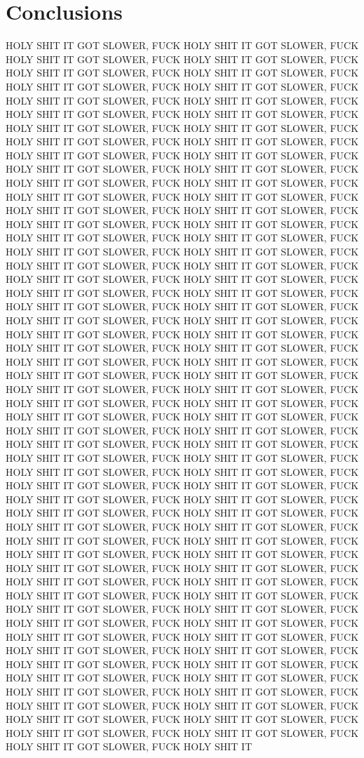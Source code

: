 \documentclass{acm_proc_article-sp}
\begin{document}
\section{Conclusions}
HOLY SHIT IT GOT SLOWER, FUCK HOLY SHIT IT GOT SLOWER, FUCK HOLY SHIT IT GOT SLOWER, FUCK HOLY SHIT IT GOT SLOWER, FUCK HOLY SHIT IT GOT SLOWER, FUCK HOLY SHIT IT GOT SLOWER, FUCK HOLY SHIT IT GOT SLOWER, FUCK HOLY SHIT IT GOT SLOWER, FUCK HOLY SHIT IT GOT SLOWER, FUCK HOLY SHIT IT GOT SLOWER, FUCK HOLY SHIT IT GOT SLOWER, FUCK HOLY SHIT IT GOT SLOWER, FUCK HOLY SHIT IT GOT SLOWER, FUCK HOLY SHIT IT GOT SLOWER, FUCK HOLY SHIT IT GOT SLOWER, FUCK HOLY SHIT IT GOT SLOWER, FUCK HOLY SHIT IT GOT SLOWER, FUCK HOLY SHIT IT GOT SLOWER, FUCK HOLY SHIT IT GOT SLOWER, FUCK HOLY SHIT IT GOT SLOWER, FUCK HOLY SHIT IT GOT SLOWER, FUCK HOLY SHIT IT GOT SLOWER, FUCK HOLY SHIT IT GOT SLOWER, FUCK HOLY SHIT IT GOT SLOWER, FUCK HOLY SHIT IT GOT SLOWER, FUCK HOLY SHIT IT GOT SLOWER, FUCK HOLY SHIT IT GOT SLOWER, FUCK HOLY SHIT IT GOT SLOWER, FUCK HOLY SHIT IT GOT SLOWER, FUCK HOLY SHIT IT GOT SLOWER, FUCK HOLY SHIT IT GOT SLOWER, FUCK HOLY SHIT IT GOT SLOWER, FUCK HOLY SHIT IT GOT SLOWER, FUCK HOLY SHIT IT GOT SLOWER, FUCK HOLY SHIT IT GOT SLOWER, FUCK HOLY SHIT IT GOT SLOWER, FUCK HOLY SHIT IT GOT SLOWER, FUCK HOLY SHIT IT GOT SLOWER, FUCK HOLY SHIT IT GOT SLOWER, FUCK HOLY SHIT IT GOT SLOWER, FUCK HOLY SHIT IT GOT SLOWER, FUCK HOLY SHIT IT GOT SLOWER, FUCK HOLY SHIT IT GOT SLOWER, FUCK HOLY SHIT IT GOT SLOWER, FUCK HOLY SHIT IT GOT SLOWER, FUCK HOLY SHIT IT GOT SLOWER, FUCK HOLY SHIT IT GOT SLOWER, FUCK HOLY SHIT IT GOT SLOWER, FUCK HOLY SHIT IT GOT SLOWER, FUCK HOLY SHIT IT GOT SLOWER, FUCK HOLY SHIT IT GOT SLOWER, FUCK HOLY SHIT IT GOT SLOWER, FUCK HOLY SHIT IT GOT SLOWER, FUCK HOLY SHIT IT GOT SLOWER, FUCK HOLY SHIT IT GOT SLOWER, FUCK HOLY SHIT IT GOT SLOWER, FUCK HOLY SHIT IT GOT SLOWER, FUCK HOLY SHIT IT GOT SLOWER, FUCK HOLY SHIT IT GOT SLOWER, FUCK HOLY SHIT IT GOT SLOWER, FUCK HOLY SHIT IT GOT SLOWER, FUCK HOLY SHIT IT GOT SLOWER, FUCK HOLY SHIT IT GOT SLOWER, FUCK HOLY SHIT IT GOT SLOWER, FUCK HOLY SHIT IT GOT SLOWER, FUCK HOLY SHIT IT GOT SLOWER, FUCK HOLY SHIT IT GOT SLOWER, FUCK HOLY SHIT IT GOT SLOWER, FUCK HOLY SHIT IT GOT SLOWER, FUCK HOLY SHIT IT GOT SLOWER, FUCK HOLY SHIT IT GOT SLOWER, FUCK HOLY SHIT IT GOT SLOWER, FUCK HOLY SHIT IT GOT SLOWER, FUCK HOLY SHIT IT GOT SLOWER, FUCK HOLY SHIT IT GOT SLOWER, FUCK HOLY SHIT IT GOT SLOWER, FUCK HOLY SHIT IT GOT SLOWER, FUCK HOLY SHIT IT GOT SLOWER, FUCK HOLY SHIT IT GOT SLOWER, FUCK HOLY SHIT IT GOT SLOWER, FUCK HOLY SHIT IT GOT SLOWER, FUCK HOLY SHIT IT GOT SLOWER, FUCK HOLY SHIT IT GOT SLOWER, FUCK HOLY SHIT IT GOT SLOWER, FUCK HOLY SHIT IT GOT SLOWER, FUCK HOLY SHIT IT GOT SLOWER, FUCK HOLY SHIT IT GOT SLOWER, FUCK HOLY SHIT IT GOT SLOWER, FUCK HOLY SHIT IT GOT SLOWER, FUCK HOLY SHIT IT GOT SLOWER, FUCK HOLY SHIT IT GOT SLOWER, FUCK HOLY SHIT IT GOT SLOWER, FUCK HOLY SHIT IT GOT SLOWER, FUCK HOLY SHIT IT GOT SLOWER, FUCK HOLY SHIT IT GOT SLOWER, FUCK HOLY SHIT IT GOT SLOWER, FUCK HOLY SHIT IT GOT SLOWER, FUCK HOLY SHIT IT GOT SLOWER, FUCK HOLY SHIT IT GOT SLOWER, FUCK HOLY SHIT IT GOT SLOWER, FUCK HOLY SHIT IT GOT SLOWER, FUCK HOLY SHIT IT GOT SLOWER, FUCK HOLY SHIT IT GOT SLOWER, FUCK HOLY SHIT IT 
\end{document}
